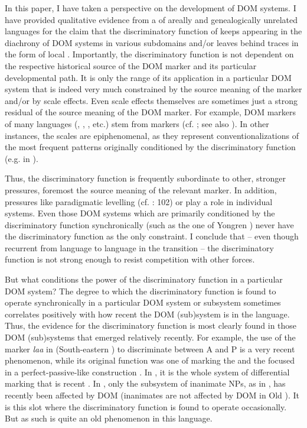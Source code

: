 \documentclass[output=paper]{langsci/langscibook}
\begin{document}
In this paper, I have taken a  perspective on the development of DOM systems. I have provided qualitative evidence from a  of areally and genealogically unrelated languages for the claim that the discriminatory function of  keeps appearing in the diachrony of DOM systems in various subdomains and/or leaves behind traces in the form of local . Importantly, the discriminatory function is not dependent on the respective historical source of the DOM marker and its particular developmental path. It is only the range of its application in a particular DOM system that is indeed very much constrained by the source meaning of the marker and/or by scale effects. Even scale effects themselves are sometimes just a strong residual of the source meaning of the DOM marker. For example, DOM markers of many languages (, , , etc.) stem from  markers (cf. \citealt{Iemmolo2010,DalrympleNikolaeva2011}; see also ). In other instances, the scales are epiphenomenal, as they represent conventionalizations of the most frequent patterns originally conditioned by the discriminatory function (e.g. in ).

Thus, the discriminatory function is frequently subordinate to other, stronger pressures, foremost the source meaning of the relevant marker. In addition, pressures like paradigmatic levelling (cf. \citealt{Jäger2007}: 102) or  play a role in individual systems. Even those DOM systems which are primarily conditioned by the discriminatory function synchronically (such as the one of Yongren ) never have the discriminatory function as the only constraint. I conclude that – even though recurrent from language to language in the transition – the discriminatory function is not strong enough to resist competition with other \largerpage forces. 

But what conditions the power of the discriminatory function in a particular DOM system? The degree to which the discriminatory function is found to operate synchronically in a particular DOM system or subsystem sometimes correlates positively with how recent the DOM (sub)system is in the language. Thus, the evidence for the discriminatory function is most clearly found in those DOM (sub)systems that emerged relatively recently. For example, the use of the marker \textit{laa} in  (South-eastern ) to discriminate between A and P is a very recent phenomenon, while its original function was one of marking the  and the focused  in a perfect-passive-like construction \citep{Nikitina2018}. In , it is the whole system of differential marking that is recent \citep{Nikitina2018}. In , only the subsystem of  inanimate NPs, as in , has recently been affected by DOM (inanimates are not affected by DOM in Old ). It is this slot where the discriminatory function is found to operate occasionally. But  as such is quite an old phenomenon in this language.
\end{document}
